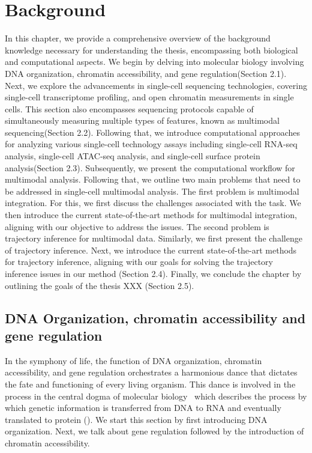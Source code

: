 %

\chapter{Background}
\label{cha:background}
\graphicspath{{chapter2/figs/}}

In this chapter, we provide a comprehensive overview of the background knowledge necessary for understanding the thesis, encompassing both biological and computational aspects. We begin by delving into molecular biology involving DNA organization, chromatin accessibility, and gene regulation(Section 2.1). Next, we explore the advancements in single-cell sequencing technologies, covering single-cell transcriptome profiling, and open chromatin measurements in single cells. This section also encompasses sequencing protocols capable of simultaneously measuring multiple types of features, known as multimodal sequencing(Section 2.2). Following that, we introduce computational approaches for analyzing various single-cell technology assays including single-cell RNA-seq analysis, single-cell ATAC-seq analysis, and single-cell surface protein analysis(Section 2.3). Subsequently, we present the computational workflow for multimodal analysis. Following that, we outline two main problems that need to be addressed in single-cell multimodal analysis. The first problem is multimodal integration. For this, we first discuss the challenges associated with the task. We then introduce the current state-of-the-art methods for multimodal integration, aligning with our objective to address the issues. The second problem is trajectory inference for multimodal data. Similarly, we first present the challenge of trajectory inference. Next, we introduce the current state-of-the-art methods for trajectory inference, aligning with our goals for solving the trajectory inference issues in our method (Section 2.4). Finally, we conclude the chapter by outlining the goals of the thesis XXX (Section 2.5).


\section{DNA Organization, chromatin accessibility and gene regulation}
\label{background:DNA_Chromatin_Regulation}
In the symphony of life, the function of DNA organization, chromatin accessibility, and gene regulation orchestrates a harmonious dance that dictates the fate and functioning of every living organism. This dance is involved in the process in the central dogma of molecular biology~\citep{crick1970central} which describes the process by which genetic information is transferred from DNA to RNA and eventually translated to protein (). We start this section by first introducing DNA organization. Next, we talk about gene regulation followed by the introduction of chromatin accessibility.

